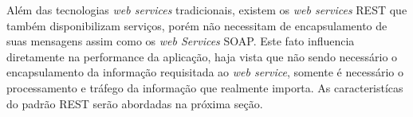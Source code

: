 	\par Além das tecnologias \textit{web services} tradicionais, existem os
\textit{web services} REST que também disponibilizam serviços, porém não
necessitam de encapsulamento de suas mensagens assim como os \textit{web
Services} SOAP. Este fato influencia diretamente na performance da aplicação,
haja vista que não sendo necessário o encapsulamento da informação requisitada
ao \textit{web service}, somente é necessário o processamento e tráfego da
informação que realmente importa. As caracteristícas do padrão REST serão
abordadas na próxima seção.